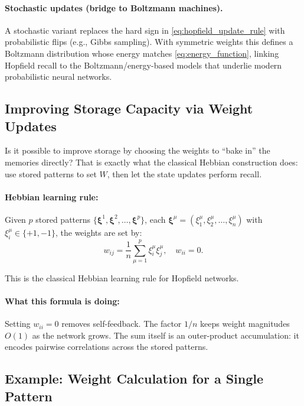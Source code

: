 \paragraph{Stochastic updates (bridge to Boltzmann machines).} A stochastic variant replaces the hard sign in \eqref{eq:hopfield_update_rule} with probabilistic flips (e.g., Gibbs sampling). With symmetric weights this defines a Boltzmann distribution whose energy matches \eqref{eq:energy_function}, linking Hopfield recall to the Boltzmann/energy-based models that underlie modern probabilistic neural networks.

\subsection{Improving Storage Capacity via Weight Updates}
\label{sec:hopfield_improving_storage_capacity_via_weight_updates}

Is it possible to improve storage by choosing the weights to ``bake in'' the memories directly? That is exactly what the classical Hebbian construction does: use stored patterns to set \(W\), then let the state updates perform recall.

\paragraph{Hebbian learning rule:}
Given \( p \) stored patterns \(\{\mathbf{\xi}^1, \mathbf{\xi}^2, \ldots, \mathbf{\xi}^p\}\), each \(\mathbf{\xi}^\mu = (\xi_1^\mu, \xi_2^\mu, \ldots, \xi_n^\mu)\) with \( \xi_i^\mu \in \{+1, -1\} \), the weights are set by:
\begin{equation}
w_{ij} = \frac{1}{n} \sum_{\mu=1}^p \xi_i^\mu \xi_j^\mu, \quad w_{ii} = 0.
\label{eq:hebbian_weights}
\end{equation}

This is the classical Hebbian learning rule for Hopfield networks.

\paragraph{What this formula is doing:}
Setting \(w_{ii}=0\) removes self-feedback. The factor \(1/n\) keeps weight magnitudes \(O(1)\) as the network grows. The sum itself is an outer-product accumulation: it encodes pairwise correlations across the stored patterns.

\subsection{Example: Weight Calculation for a Single Pattern}
\label{sec:hopfield_example_weight_calculation_for_a_single_pattern}

